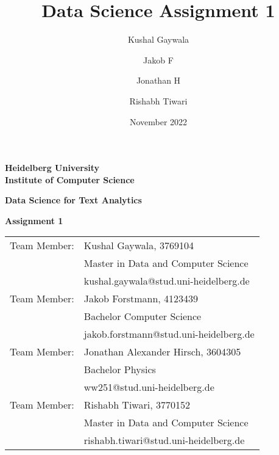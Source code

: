 \documentclass{article}
\begin{document}
\begin{titlepage}

\title{Data Science Assignment 1}
\author[1]{Kushal Gaywala}
\author[2]{Jakob F}
\author[3]{Jonathan H}
\author[4]{Rishabh Tiwari}
\date{November 2022}

\begin{center}
\textbf{ 
\LARGE Heidelberg University\\
\smallskip
\Large Institute of Computer Science\\
\smallskip
}

\vspace{3cm}

\textbf{\Large Data Science for Text Analytics}

\vspace{1\baselineskip}
{\huge
\textbf{Assignment 1}
}
\end{center}

\vspace{3cm}

{\large
\begin{tabular}[l]{ll}
Team Member: &Kushal Gaywala, 3769104\\ & Master in Data and Computer Science \\ &
   kushal.gaywala@stud.uni-heidelberg.de\\
Team Member: &Jakob Forstmann, 4123439\\ &Bachelor Computer Science\\ &
    jakob.forstmann@stud.uni-heidelberg.de\\
Team Member: & Jonathan Alexander Hirsch, 3604305\\
  & Bachelor Physics \\ & ww251@stud.uni-heidelberg.de\\
Team Member: &Rishabh Tiwari, 3770152\\ & Master in Data and Computer Science \\ & rishabh.tiwari@stud.uni-heidelberg.de\\
\end{tabular}
}

\end{titlepage}
\large
\end{document}
